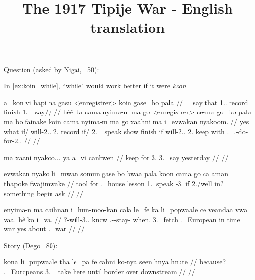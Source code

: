 \documentclass{article}
\title{The 1917 Tipije War - English translation}
\begin{document}
\maketitle


Question (asked by Nigai, ~50):


In \ref{ex:koin_while}, “while" would work better if it were \textit{koon} 

\pex \label{ques}
\a \label{ex:koin_while}
\begingl
\gla a=kon vi hapi na gasu <enregistrer> koin gase=bo pala
// = say that  1.. record finish 1.= say// \glft  {}
//\endgl
\a
\begingl
\gla hêê da cama nyima-m ma go <enregistrer> ce-ma go=bo pala ma bo fainake koin cama nyima-m ma go xaahni ma i=evwakan nyakoom.
// \glb yes what if/ will-2..  2. record if/ 2.= speak   show finish if will-2..  2. keep with .=.-do- for-2..
// \glft {}
// \endgl

\a
\begingl
\gla ma xaani nyakoo... ya a=vi canbwen
// \glb {} keep for 3. 3.=say yesterday
// \glft {}
// \endgl

\a
\begingl
\gla evwakan nyako li=mwan somun gase bo bwaa pala koon cama go ca aman thapoke fwajimwake
// \glb tool for .=house lesson 1..   speak -3. if 2./well in? something begin ask
// \glft {}
// \endgl

\a
\begingl
\gla enyima-n ma caihnan i=hun-moo-kan cala le=fe ka li=popwaale ce veandan vwa vaa. hê ko i=va. 
// \glb ?-will-3..  know .--stay- when. 3.=fetch  .=European in time  war yes about .=war
// \glft {}
// \endgl

\xe

Story (Dego ~80):

\pex
\a
\begingl
\gla kona li=pupwaale tha le=pa fe cahni ko-nya seen hnya hnute
// \glb because? .=Europeans  3.= take here until border over downstream
// \glft {}
// \endgl
\end{document}
